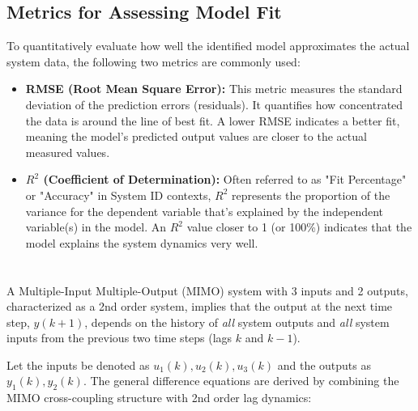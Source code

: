 \documentclass[a4paper,12pt]{article}
\begin{document}
\subsection{Metrics for Assessing Model Fit}
To quantitatively evaluate how well the identified model approximates the actual system data, the following two metrics are commonly used:

\begin{itemize}
    \item \textbf{RMSE (Root Mean Square Error):} 
    This metric measures the standard deviation of the prediction errors (residuals). It quantifies how concentrated the data is around the line of best fit. A lower RMSE indicates a better fit, meaning the model's predicted output values are closer to the actual measured values.
    
    \item \textbf{$R^2$ (Coefficient of Determination):} 
    Often referred to as "Fit Percentage" or "Accuracy" in System ID contexts, $R^2$ represents the proportion of the variance for the dependent variable that's explained by the independent variable(s) in the model. An $R^2$ value closer to 1 (or 100\%) indicates that the model explains the system dynamics very well.
\end{itemize}


\section{}

A Multiple-Input Multiple-Output (MIMO) system with 3 inputs and 2 outputs, characterized as a 2nd order system, implies that the output at the next time step, $y(k+1)$, depends on the history of \textit{all} system outputs and \textit{all} system inputs from the previous two time steps (lags $k$ and $k-1$).

Let the inputs be denoted as $u_1(k), u_2(k), u_3(k)$ and the outputs as $y_1(k), y_2(k)$. The general difference equations are derived by combining the MIMO cross-coupling structure with 2nd order lag dynamics:
\end{document}
